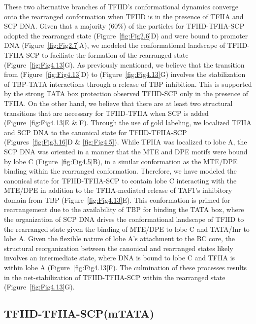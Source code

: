 \indent These two alternative branches of TFIID's conformational dynamics converge onto the rearranged conformation when TFIID is in the presence of TFIIA and SCP DNA. Given that a majority (60\%) of the particles for TFIID-TFIIA-SCP adopted the rearranged state (Figure~\ref{fig:Fig2.6}D) and were bound to promoter DNA (Figure~\ref{fig:Fig2.7}A), we modeled the conformational landscape of TFIID-TFIIA-SCP to faciliate the formation of the rearranged state (Figure~\ref{fig:Fig4.13}G). As previously mentioned, we believe that the transition from (Figure~\ref{fig:Fig4.13}D) to (Figure~\ref{fig:Fig4.13}G) involves the stabilization of TBP-TATA interactions through a release of TBP inhibition. This is supported by the strong TATA box protection observed  TFIID-SCP only in the presence of TFIIA. On the other hand, we believe that there are at least two structural transitions that are necessary for TFIID-TFIIA when SCP is added (Figure~\ref{fig:Fig4.13}E \& F). Through the use of gold labeling, we localized TFIIA and SCP DNA to the canonical state for TFIID-TFIIA-SCP (Figures~\ref{fig:Fig3.16}D \& \ref{fig:Fig4.5}). While TFIIA was localized to lobe A, the SCP DNA was oriented in a manner that the MTE and DPE motifs were bound by lobe C (Figure~\ref{fig:Fig4.5}B), in a similar conformation as the MTE/DPE binding within the rearranged conformation. Therefore, we have modeled the canonical state for TFIID-TFIIA-SCP to contain lobe C interacting with the MTE/DPE in addition to the TFIIA-mediated release of TAF1's inhibitory domain from TBP (Figure~\ref{fig:Fig4.13}E). This conformation is primed for rearrangement due to the availability of TBP for binding the TATA box, where the organization of SCP DNA drives the conformational landscape of TFIID to the rearranged state given the binding of MTE/DPE to lobe C and TATA/Inr to lobe A. Given the flexible nature of lobe A's attachment to the BC core, the structural reorganization between the canonical and rearranged states likely involves an intermediate state, where DNA is bound to lobe C and TFIIA is within lobe A (Figure~\ref{fig:Fig4.13}F). The culmination of these processes results in the net-stabilization of TFIID-TFIIA-SCP within the rearranged state (Figure~\ref{fig:Fig4.13}G).\\ 

\subsection{TFIID-TFIIA-SCP(mTATA)}

